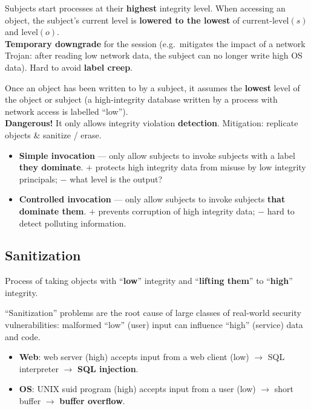 \begin{defnbox}[title=Variant 1 --- low-water-mark for subjects]
Subjects start processes at their \textbf{highest} integrity level. When accessing an
object, the subject's current level is \textbf{lowered to the lowest} of
$\text{current-level}(s)$ and $\text{level}(o)$. \\
\textbf{Temporary downgrade} for the session (e.g.\ mitigates the impact of a network
Trojan: after reading low network data, the subject can no longer write high OS data).
Hard to avoid \textbf{label creep}.
\end{defnbox}

\begin{defnbox}[title=Variant 2 --- low-water-mark for objects]
Once an object has been written to by a subject, it assumes the \textbf{lowest} level of
the object or subject (a high-integrity database written by a process with network
access is labelled ``low''). \\
\textbf{Dangerous!} It only allows integrity violation \textbf{detection}. Mitigation:
replicate objects \& sanitize / erase.
\end{defnbox}

\begin{defnbox}[title=Invocation]
\begin{itemize}
  \item \textbf{Simple invocation} --- only allow subjects to invoke subjects with a label
        \textbf{they dominate}. $+$ protects high integrity data from misuse by low
        integrity principals; $-$ what level is the output?
  \item \textbf{Controlled invocation} --- only allow subjects to invoke subjects
        \textbf{that dominate them}. $+$ prevents corruption of high integrity data;
        $-$ hard to detect polluting information.
\end{itemize}
\end{defnbox}

\subsection{Sanitization}

\begin{defnbox}[title=Sanitization]
Process of taking objects with ``\textbf{low}'' integrity and ``\textbf{lifting them}''
to ``\textbf{high}'' integrity.
\end{defnbox}

\begin{warnbox}[title=Root cause of many vulnerabilities]
``Sanitization'' problems are the root cause of large classes of real-world security
vulnerabilities: malformed ``low'' (user) input can influence ``high'' (service) data
and code.
\begin{itemize}
  \item \textbf{Web}: web server (high) accepts input from a web client (low) $\to$ SQL
        interpreter $\to$ \textbf{SQL injection}.
  \item \textbf{OS}: UNIX suid program (high) accepts input from a user (low) $\to$
        short buffer $\to$ \textbf{buffer overflow}.
\end{itemize}
\end{warnbox}

